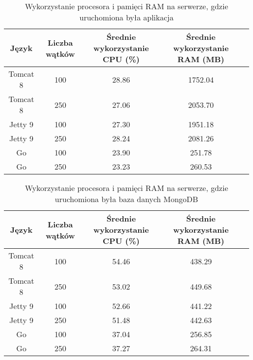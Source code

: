 
\begin{table}[!htb]
\centering
\caption{Wykorzystanie procesora i pamięci RAM na serwerze, gdzie uruchomiona była aplikacja}
\label{tab:app-full-crud}
\begin{tabular}{@{}ccccl@{}}
\toprule
\textbf{Język} & \textbf{Liczba wątków} & \multicolumn{1}{p{3cm}}{\textbf{Średnie wykorzystanie CPU (\%)}} & \multicolumn{1}{p{3cm}}{\textbf{Średnie wykorzystanie RAM (MB)}} &  \\ \midrule
Tomcat 8       & 100                    & 28.86                             & 1752.04                          &  \\
Tomcat 8       & 250                    & 27.06                             & 2053.70                          &  \\
Jetty 9       & 100                    & 27.30                             & 1951.18                          &  \\
Jetty 9       & 250                    & 28.24                             & 2081.26                          &  \\
Go       & 100                    & 23.90                             & 251.78                          &  \\
Go       & 250                    & 23.23                             & 260.53                          &  \\
\bottomrule
\end{tabular}
\end{table}


\begin{table}[!htb]
\centering
\caption{Wykorzystanie procesora i pamięci RAM na serwerze, gdzie uruchomiona była baza danych MongoDB}
\label{tab:mongo-full-crud}
\begin{tabular}{@{}ccccl@{}}
\toprule
\textbf{Język} & \textbf{Liczba wątków} & \multicolumn{1}{p{3cm}}{\textbf{Średnie wykorzystanie CPU (\%)}} & \multicolumn{1}{p{3cm}}{\textbf{Średnie wykorzystanie RAM (MB)}} &  \\ \midrule
Tomcat 8       & 100                    & 54.46                             & 438.29                          &  \\
Tomcat 8       & 250                    & 53.02                             & 449.68                          &  \\
Jetty 9       & 100                    & 52.66                             & 441.22                          &  \\
Jetty 9       & 250                    & 51.48                             & 442.63                          &  \\
Go       & 100                    & 37.04                             & 256.85                          &  \\
Go       & 250                    & 37.27                             & 264.31                          &  \\
\bottomrule
\end{tabular}
\end{table}

